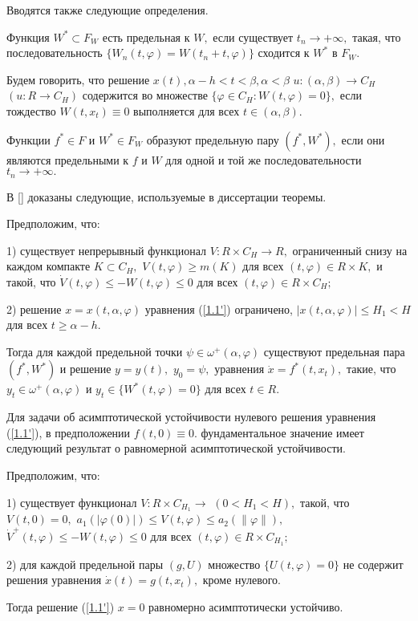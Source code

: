 Вводятся также следующие определения.

Функция $W^*\subset F_W$ есть предельная к $W,$  если
	существует $t_n\to +\infty, $  такая,  что  последовательность $\{
	W_n(t,\varphi )=W(t_n+t,\varphi )\}$ сходится к $W^*$  в $F_{W}.$

Будем говорить, что решение $x(t), \alpha - h < t < \beta, \alpha < \beta$
	$u : (\alpha ,\beta )\to C_{H}$ $(u : R\to C_{H})$ содержится во
	множестве $\{ \varphi\in C_{H} : W(t,\varphi )=0 \},$ если
	тождество $W(t, x_t)\equiv 0$ выполняется для всех $t\in (\alpha
	,\beta )$.

Функции $f^* \in F$ и $W^*\in F_W$ образуют
	предельную пару $(f^*,W^*),$ если они являются предельными  к $f$ и
	$W$ для  одной  и  той  же  последовательности $t_n\to +\infty .$

В [] доказаны следующие, используемые в диссертации теоремы.

\begin{theorem}\label{t-1.3} Предположим, что:
	
	1) 
	существует непрерывный функционал $V : R \times C_H\to R,$  ограниченный
	снизу на каждом компакте $K\subset C_H,$ $V(t,\varphi )\ge m(K)$
	для всех $(t,\varphi )\in R \times K,$ и такой, что $\dot
	V(t,\varphi )\le -W(t,\varphi )\le 0$  для  всех $(t,\varphi )\in R
	\times C_H;$
	
	2) решение $x=x(t,\alpha ,\varphi )$ уравнения (\ref{1.1'})  ограничено,
	$|x(t,\alpha ,\varphi )|\le H_1<H$
	для всех $t\ge\alpha -h.$
	
	Тогда для каждой  предельной
	точки $\psi\in\omega ^+(\alpha ,\varphi )$  существуют  предельная
	пара  $(f^*, W^*)$ и решение $y=y(t),$ $y_0=\psi, $ уравнения $\dot x=f^*(t,x_t),$  такие,  что
	$ y_t\in \omega ^+(\alpha ,\varphi )$ и
	$y_t \in \{ W^*(t,\varphi )=0 \}$
		для всех  $t\in R.$
\end{theorem}
	
Для задачи об асимптотической устойчивости нулевого решения уравнения (\ref{1.1'}), в предположении $f(t,0)\equiv 0.$ фундаментальное значение имеет следующий  результат о равномерной асимптотической устойчивости.
	
	\begin{theorem}\label{t-4.5} Предположим, что:
		
		1) существует функционал $V: R \times C_{H_1}\to $ $(0<H_1<H),$
		такой,  что $V(t,0)=0,$ $a_1(|\varphi (0)|)\le V(t,\varphi )\le a_2(\|\varphi \| ),$
		$\dot V^+(t,\varphi )\le -W(t,\varphi )\le 0$ для всех
		$(t,\varphi )\in R \times C_{H_1};$
		
		2) для  каждой  предельной пары $(g,U)$  множество $\{ U(t,\varphi )=0\}$  не
		содержит решения уравнения $\dot x(t)=g(t,x_t),$  кроме нулевого.
		
		
		Тогда решение (\ref{1.1'})  $x=0$ равномерно асимптотически устойчиво.
	\end{theorem}
	

